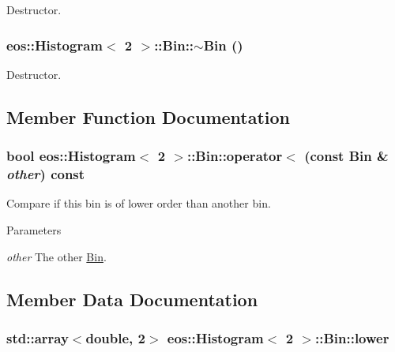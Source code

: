 Destructor. \hypertarget{structeos_1_1Histogram_3_012_01_4_1_1Bin_a945e453f3b5aa775c74122b2a5c8c983}{
\subsubsection[{$\sim$Bin}]{\setlength{\rightskip}{0pt plus 5cm}eos::Histogram$<$ 2 $>$::Bin::$\sim$Bin ()}}
\label{structeos_1_1Histogram_3_012_01_4_1_1Bin_a945e453f3b5aa775c74122b2a5c8c983}


Destructor. 

\subsection{Member Function Documentation}
\hypertarget{structeos_1_1Histogram_3_012_01_4_1_1Bin_a5f5d9d357e94ce75149ac710b954bb44}{
\subsubsection[{operator$<$}]{\setlength{\rightskip}{0pt plus 5cm}bool eos::Histogram$<$ 2 $>$::Bin::operator$<$ (const Bin \& {\em other}) const}}
\label{structeos_1_1Histogram_3_012_01_4_1_1Bin_a5f5d9d357e94ce75149ac710b954bb44}
Compare if this bin is of lower order than another bin.


\begin{DoxyParams}{Parameters}
\item[{\em other}]The other \hyperlink{structeos_1_1Histogram_3_012_01_4_1_1Bin}{Bin}. \end{DoxyParams}


\subsection{Member Data Documentation}
\hypertarget{structeos_1_1Histogram_3_012_01_4_1_1Bin_a1e425081536674ebe0303fbdeede8cd2}{
\subsubsection[{lower}]{\setlength{\rightskip}{0pt plus 5cm}std::array$<$double, 2$>$ eos::Histogram$<$ 2 $>$::Bin::lower}}
\label{structeos_1_1Histogram_3_012_01_4_1_1Bin_a1e425081536674ebe0303fbdeede8cd2}


